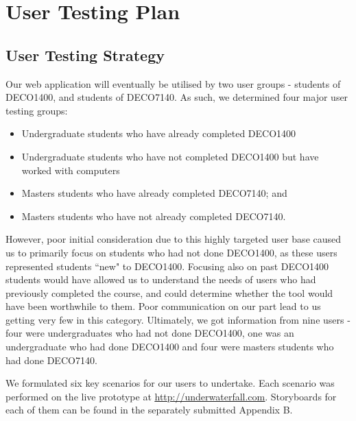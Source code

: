 \documentclass[10pt]{article}
\begin{document}
\newpage

\section*{User Testing Plan}

\subsection*{User Testing Strategy}

Our web application will eventually be utilised by two user groups - students of DECO1400, and students of DECO7140. As such, we determined four major user testing groups:

\begin{itemize}
\item Undergraduate students who have already completed DECO1400
\item Undergraduate students who have not completed DECO1400 but have worked with computers
\item Masters students who have already completed DECO7140; and
\item Masters students who have not already completed DECO7140.
\end{itemize}

However, poor initial consideration due to this highly targeted user base caused us to primarily focus on students who had not done DECO1400, as these users represented students ``new" to DECO1400. Focusing also on past DECO1400 students would have allowed us to understand the needs of users who had previously completed the course, and could determine whether the tool would have been worthwhile to them. Poor communication on our part lead to us getting very few in this category. Ultimately, we got information from nine users - four were undergraduates who had not done DECO1400, one was an undergraduate who had done DECO1400 and four were masters students who had done DECO7140.

We formulated six key scenarios for our users to undertake. Each scenario was performed on the live prototype at \underline{\url{http://underwaterfall.com}}. Storyboards for each of them can be found in the separately submitted Appendix B.
\end{document}
